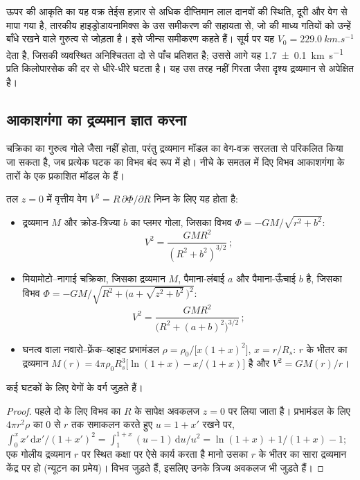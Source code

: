 
ऊपर की आकृति का यह वक्र तेईस हज़ार से अधिक दीप्तिमान लाल दानवों की
स्थिति, दूरी और वेग से मापा गया है, तारकीय हाइड्रोडायनामिक्स के उस समीकरण
की सहायता से, जो  की माध्य गतियों को उन्हें
बाँधे रखने वाले गुरुत्व से जोड़ता है। इसे जीन्स समीकरण कहते हैं।
सूर्य पर यह $V_0 = \qty{229.0}{km.s^{-1}}$ देता है, जिसकी व्यवस्थित
अनिश्चितता दो से पाँच प्रतिशत है; उससे आगे यह
\qty[separate-uncertainty=true]{1.7 \pm 0.1}{km.s^{-1}} प्रति किलोपारसेक की दर से धीरे-धीरे घटता है। यह
उस तरह नहीं गिरता जैसा दृश्य द्रव्यमान से अपेक्षित है।

\subsection*{आकाशगंगा का द्रव्यमान ज्ञात करना}

चक्रिका का गुरुत्व गोले जैसा नहीं होता, परंतु द्रव्यमान मॉडल का
वेग-वक्र सरलता से परिकलित किया जा सकता है, जब प्रत्येक घटक का विभव
बंद रूप में हो। नीचे के समतल में दिए विभव
आकाशगंगा के तारों के एक प्रकाशित मॉडल के हैं।

\begin{proposition}[तीन द्रव्यमान मॉडलों के वृत्तीय वेग]\label{prop:b3:milky-way-galaxies:models}
तल $z = 0$ में वृत्तीय वेग $V^2 = R\,\partial\Phi/\partial R$
निम्न के लिए यह होता है:
\begin{itemize}
\item द्रव्यमान $M$ और क्रोड-त्रिज्या $b$ का प्लमर गोला, जिसका विभव
  $\Phi = -GM/\sqrt{r^2 + b^2}$:
  \[ V^2 = \frac{GMR^2}{(R^2 + b^2)^{3/2}}\,; \]
\item मियामोटो--नागाई चक्रिका, जिसका द्रव्यमान $M$, पैमाना-लंबाई $a$ और
  पैमाना-ऊँचाई $b$ है, जिसका विभव
  $\Phi = -GM\big/\sqrt{R^2 + \bigl(a + \sqrt{z^2 + b^2}\,\bigr)^2}$:
  \[ V^2 = \frac{GMR^2}{\bigl(R^2 + (a + b)^2\bigr)^{3/2}}\,; \]
\item घनत्व वाला नवारो--फ़्रेंक--व्हाइट प्रभामंडल
  $\rho = \rho_0\big/\bigl[x(1 + x)^2\bigr]$, $x = r/R_s$: $r$ के भीतर का द्रव्यमान
  $M(r) = 4\pi\rho_0R_s^3\bigl[\ln(1 + x) - x/(1 + x)\bigr]$ है और
  $V^2 = GM(r)/r$।
\end{itemize}
कई घटकों के लिए वेगों के वर्ग जुड़ते हैं।
\end{proposition}

\begin{proof}
पहले दो के लिए विभव का $R$ के सापेक्ष अवकलज
$z = 0$ पर लिया जाता है। प्रभामंडल के लिए $4\pi r^2\rho$ का 0 से $r$ तक समाकलन करते हुए
$u = 1 + x'$ रखने पर, $\int_0^x x'\,\mathrm{d}x'/(1 + x')^2 =
\int_1^{1+x}(u - 1)\,\mathrm{d}u/u^2 = \ln(1 + x) + 1/(1 + x) - 1$; एक
गोलीय द्रव्यमान $r$ पर स्थित कक्षा पर ऐसे कार्य करता है मानो उसका $r$ के भीतर का सारा द्रव्यमान
केंद्र पर हो (न्यूटन का प्रमेय)। विभव जुड़ते हैं, इसलिए उनके त्रिज्य
अवकलज भी जुड़ते हैं।
\end{proof}

